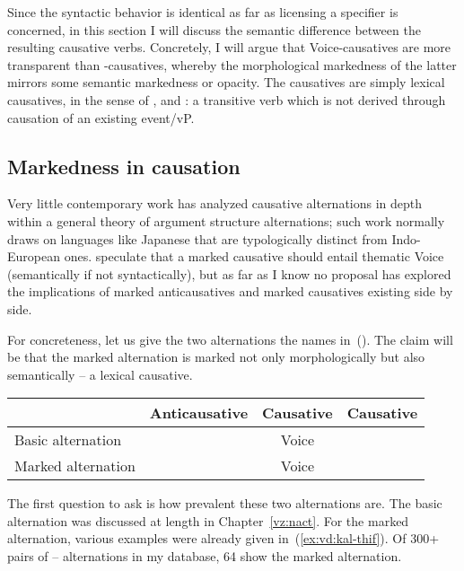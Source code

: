 Since the syntactic behavior is identical as far as licensing a specifier is concerned, in this section I will discuss the semantic difference between the resulting causative verbs. Concretely, I will argue that Voice-causatives are more transparent than {\vd}-causatives, whereby the morphological markedness of the latter mirrors some semantic markedness or opacity. The {\vd} causatives are simply lexical causatives, in the sense of \cite{fodor70}, \cite{miyagawa98} and \cite{harley08}: a transitive verb which is not derived through causation of an existing event/vP.

		\subsection{Markedness in causation} \label{vd:caus:marked}
Very little contemporary work has analyzed causative alternations in depth within a general theory of argument structure alternations; such work normally draws on languages like Japanese \citep{jacobsen92} that are typologically distinct from Indo-European ones. \citet[62ff]{layering15} speculate that a marked causative should entail thematic Voice (semantically if not syntactically), but as far as I know no proposal has explored the implications of marked anticausatives and marked causatives existing side by side.

For concreteness, let us give the two alternations the names in~(\nextx). The claim will be that the marked alternation is marked not only morphologically but also semantically -- a lexical causative.
\ex
\begin{tabular}{l|ccc}
	&	Anticausative & Causative & Causative\\\hline
Basic alternation	& {\vz} & Voice &   \\
Marked alternation		&		&  Voice & {\vd}\\
\end{tabular}
\xe

The first question to ask is how prevalent these two alternations are. The basic alternation was discussed at length in Chapter~\ref{vz:nact}. For the marked alternation, various examples were already given in~(\ref{ex:vd:kal-thif}). Of 300+ pairs of {\tkal}--{\thif} alternations in my database, 64 show the marked alternation.%

%
%

